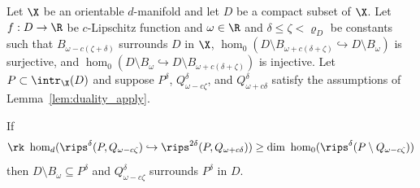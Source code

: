 
\begin{theorem}\label{thm:algo_tcc}
  Let $\X$ be an orientable $d$-manifold and let $D$ be a compact subset of $\X$.
  Let $f : D\to\R$ be $c$-Lipschitz function and $\omega\in\R$ and $\delta\leq\zeta < \varrho_D$ be constants such that
  $B_{\omega - c(\zeta +\delta)}$ surrounds $D$ in $\X$,
  $\hom_0(D\setminus B_{\omega+c(\delta+\zeta)}\hookrightarrow D\setminus B_\omega)$ is surjective, and
  $\hom_0(D\setminus B_\omega\hookrightarrow D\setminus B_{\omega+c(\delta+\zeta)})$ is injective.
  Let $P\subset \intr_\X(D)$ and suppose $P^\delta$, $Q_{\omega-c\zeta}^\delta$, and $Q_{\omega+c\delta}^\delta$ satisfy the assumptions of Lemma~\ref{lem:duality_apply}.

  If
  \[\rk~\hom_d(\rips^\delta(P, Q_{\omega -c\zeta})\hookrightarrow \rips^{2\delta}(P, Q_{\omega+c\delta})) \geq \dim~\hom_0(\rips^\delta(P\setminus Q_{\omega-c\zeta}))\]
  then $D\setminus B_\omega\subseteq P^\delta$ and $Q_{\omega-c\zeta}^\delta$ surrounds $P^\delta$ in $D$.
\end{theorem}
